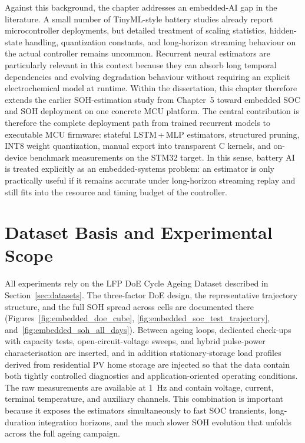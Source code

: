 \documentclass[
    a4paper,
    12pt,
    titlepage,
    bibliography=totoc,
    twoside=on,
    parskip=false,
    numbers=noenddot,
    cleardoublepage=empty,
    DIV=12,
    BCOR=12.0mm,
    headheight=36pt,
    headings=openright
]{scrreprt}
\begin{document}
Against this background, the chapter addresses an embedded-AI gap in the literature. A small number of TinyML-style battery studies already report microcontroller deployments,\autocite{crocioniLiIonBatteriesParameter2020,Embedded_AI_only_SOC_mobile,Embedded_AI_SOH_badData} but detailed treatment of scaling statistics, hidden-state handling, quantization constants, and long-horizon streaming behaviour on the actual controller remains uncommon. Recurrent neural estimators are particularly relevant in this context because they can absorb long temporal dependencies and evolving degradation behaviour without requiring an explicit electrochemical model at runtime.\autocite{liOnlineCapacityEstimation2021,wangFusionEstimationLithiumion2022} Within the dissertation, this chapter therefore extends the earlier SOH-estimation study from Chapter~5 toward embedded SOC and SOH deployment on one concrete MCU platform. The central contribution is therefore the complete deployment path from trained recurrent models to executable MCU firmware: stateful LSTM\,+\,MLP estimators, structured pruning, INT8 weight quantization, manual export into transparent C kernels, and on-device benchmark measurements on the STM32 target. In this sense, battery AI is treated explicitly as an embedded-systems problem: an estimator is only practically useful if it remains accurate under long-horizon streaming replay and still fits into the resource and timing budget of the controller.

\section{Dataset Basis and Experimental Scope}
All experiments rely on the LFP DoE Cycle Ageing Dataset described in Section~\ref{sec:datasets}.\autocite{lfpDoeCycleAgingDataset2025,jgneJGCFR186501800mAh32VProductSpecification} The three-factor DoE design, the representative trajectory structure, and the full SOH spread across cells are documented there (Figures~\ref{fig:embedded_doe_cube}, \ref{fig:embedded_soc_test_trajectory}, and~\ref{fig:embedded_soh_all_days}).\autocite{siebertzStatistischeVersuchsplanung2017} Between ageing loops, dedicated check-ups with capacity tests, open-circuit-voltage sweeps, and hybrid pulse-power characterisation are inserted, and in addition stationary-storage load profiles derived from residential PV home storage are injected so that the data contain both tightly controlled diagnostics and application-oriented operating conditions.\autocite{kucevicStandardBatteryEnergy2020a} The raw measurements are available at \SI{1}{\hertz} and contain voltage, current, terminal temperature, and auxiliary channels. This combination is important because it exposes the estimators simultaneously to fast SOC transients, long-duration integration horizons, and the much slower SOH evolution that unfolds across the full ageing campaign.
\end{document}
